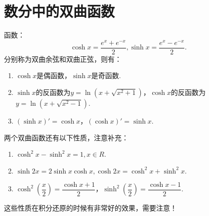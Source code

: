 \section{数分中的双曲函数}

\begin{proposition}
	函数：
	\begin{equation}
		\cosh{x}=\dfrac{e^x+e^{-x}}{2},\sinh{x}=\dfrac{e^x-e^{-x}}{2}.
	\end{equation}
	分别称为双曲余弦和双曲正弦，则有：
	\begin{enumerate}
		\item $\cosh{x}$是偶函数，$\sinh{x}$是奇函数.
		\item $\sinh{x}$的反函数为$y=\ln(x+\sqrt{x^2+1})$，$\cosh{x}$的反函数为$y=\ln(x+\sqrt{x^2-1})$.
		\item $(\sinh{x})'=\cosh{x}$，$(\cosh{x})'=\sinh{x}.$
	\end{enumerate}
\end{proposition}

\begin{proposition}[补充结论]
	两个双曲函数还有以下性质，注意补充：
	\begin{enumerate}
		\item $\cosh^2{x}-\sinh^2{x}=1,x\in R$.
		\item $\sinh{2x}=2\sinh{x}\cosh{x},\cosh{2x}=\cosh^2{x}+\sinh^2{x}.$
		\item $\cosh^2\left(\dfrac{x}{2}\right)=\dfrac{\cosh{x}+1}{2}$，$\sinh^2\left(\dfrac{x}{2}\right)=\dfrac{\cosh{x}-1}{2}.$
	\end{enumerate}
	这些性质在积分还原的时候有非常好的效果，需要注意！
\end{proposition}